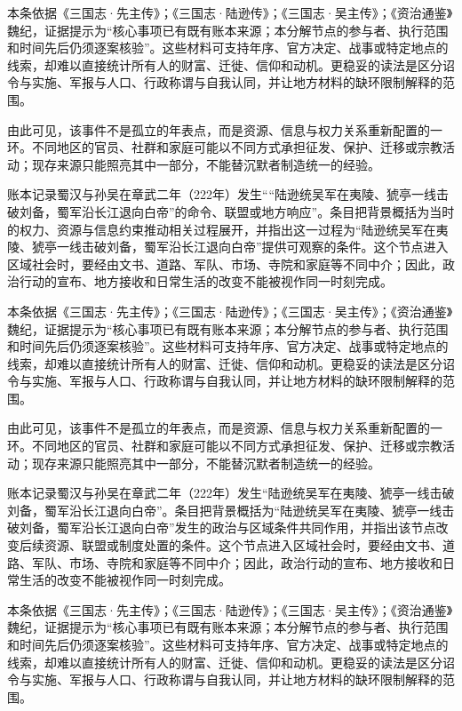 本条依据《三国志·先主传》；《三国志·陆逊传》；《三国志·吴主传》；《资治通鉴》魏纪，证据提示为“核心事项已有既有账本来源；本分解节点的参与者、执行范围和时间先后仍须逐案核验”。这些材料可支持年序、官方决定、战事或特定地点的线索，却难以直接统计所有人的财富、迁徙、信仰和动机。更稳妥的读法是区分诏令与实施、军报与人口、行政称谓与自我认同，并让地方材料的缺环限制解释的范围。

由此可见，该事件不是孤立的年表点，而是资源、信息与权力关系重新配置的一环。不同地区的官员、社群和家庭可能以不同方式承担征发、保护、迁移或宗教活动；现存来源只能照亮其中一部分，不能替沉默者制造统一的经验。

账本记录蜀汉与孙吴在章武二年（222年）发生““陆逊统吴军在夷陵、猇亭一线击破刘备，蜀军沿长江退向白帝”的命令、联盟或地方响应”。条目把背景概括为当时的权力、资源与信息约束推动相关过程展开，并指出这一过程为“陆逊统吴军在夷陵、猇亭一线击破刘备，蜀军沿长江退向白帝”提供可观察的条件。这个节点进入区域社会时，要经由文书、道路、军队、市场、寺院和家庭等不同中介；因此，政治行动的宣布、地方接收和日常生活的改变不能被视作同一时刻完成。

本条依据《三国志·先主传》；《三国志·陆逊传》；《三国志·吴主传》；《资治通鉴》魏纪，证据提示为“核心事项已有既有账本来源；本分解节点的参与者、执行范围和时间先后仍须逐案核验”。这些材料可支持年序、官方决定、战事或特定地点的线索，却难以直接统计所有人的财富、迁徙、信仰和动机。更稳妥的读法是区分诏令与实施、军报与人口、行政称谓与自我认同，并让地方材料的缺环限制解释的范围。

由此可见，该事件不是孤立的年表点，而是资源、信息与权力关系重新配置的一环。不同地区的官员、社群和家庭可能以不同方式承担征发、保护、迁移或宗教活动；现存来源只能照亮其中一部分，不能替沉默者制造统一的经验。

账本记录蜀汉与孙吴在章武二年（222年）发生“陆逊统吴军在夷陵、猇亭一线击破刘备，蜀军沿长江退向白帝”。条目把背景概括为“陆逊统吴军在夷陵、猇亭一线击破刘备，蜀军沿长江退向白帝”发生的政治与区域条件共同作用，并指出该节点改变后续资源、联盟或制度处置的条件。这个节点进入区域社会时，要经由文书、道路、军队、市场、寺院和家庭等不同中介；因此，政治行动的宣布、地方接收和日常生活的改变不能被视作同一时刻完成。

本条依据《三国志·先主传》；《三国志·陆逊传》；《三国志·吴主传》；《资治通鉴》魏纪，证据提示为“核心事项已有既有账本来源；本分解节点的参与者、执行范围和时间先后仍须逐案核验”。这些材料可支持年序、官方决定、战事或特定地点的线索，却难以直接统计所有人的财富、迁徙、信仰和动机。更稳妥的读法是区分诏令与实施、军报与人口、行政称谓与自我认同，并让地方材料的缺环限制解释的范围。

